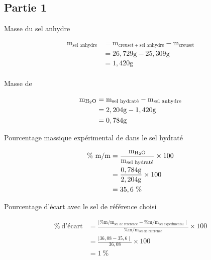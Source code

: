\documentclass[11pt]{article}
\begin{document}
\subsection*{Partie 1}
\begin{enumerate}
{\bfseries\item Masse du sel anhydre}
\begin{equation*}
\begin{split}
\mathrm{m_{\text{sel anhydre}}}&=\mathrm{m_{creuset+\text{sel anhydre}}-\mathrm{m_{creuset}}}\\
	                           &=26,729\mathrm{g}-25,309\mathrm{g}\\
	                           &=1,420\mathrm{g}\\
\end{split}
\end{equation*}

{\bfseries\item Masse de }
\begin{equation*}
\begin{split}
\mathrm{m_{\ce{H2O}}}&=\mathrm{m_{\text{sel hydraté}}-\mathrm{m_{\text{sel anhydre}}}}\\
	                 &=2,204\mathrm{g}-1,420\mathrm{g}\\
	                 &=0,784\mathrm{g}\\
\end{split}
\end{equation*}

{\bfseries\item Pourcentage massique expérimental de  dans le sel hydraté}
\begin{equation*}
\begin{split}
\%\ \mathrm{m/m}&=\frac{\mathrm{m_{\ce{H2O}}}}{\mathrm{m_{\text{sel hydraté}}}}\times 100\\
	            &=\frac{0,784\mathrm{g}}{2,204\mathrm{g}}\times 100\\
	            &=35,6\ \%\\
\end{split}
\end{equation*}

{\bfseries\item Pourcentage d'écart avec le sel de référence choisi}
\begin{equation*}
\begin{split}
\%\ \text{d'écart}&=\frac{\mid\mathrm{\% m/m_{\text{sel de référence}}}-\mathrm{\% m/m_{\text{sel expérimental}}}\mid}{\mathrm{\% m/m_{\text{sel de référence}}}}\times 100\\
	              &=\frac{\mid 36,08-35,6\mid}{36,08}\times 100\\
	              &=1\ \%\\
\end{split}
\end{equation*}
\end{enumerate}
\end{document}
